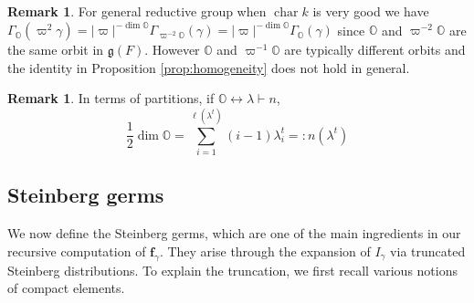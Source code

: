 \documentclass{amsart}
\numberwithin{equation}{section}
\theoremstyle{definition}
\newtheorem{remark}[lemma]{Remark}%
\newcommand{\fgamma}{\mathbf{f}_{\gamma}}
\newcommand{\fg}{\mathfrak{g}}
\DeclareMathOperator{\cchar}{\text{char}}
\begin{document}
\begin{remark} For general reductive group when $\cchar k$ is very good we have $\Gamma_{\mathbb{O}}(\varpi^2\gamma)=|\varpi|^{-\dim \mathbb{O}}\Gamma_{\varpi^{-2}\mathbb{O}}(\gamma)=|\varpi|^{-\dim\mathbb{O}}\Gamma_\mathbb{O}(\gamma)$ since $\mathbb{O}$ and $\varpi^{-2}\mathbb{O}$ are the same orbit in $\fg(F)$. However $\mathbb{O}$ and $\varpi^{-1}\mathbb{O}$ are typically different orbits and the identity in Proposition \ref{prop:homogeneity} does not hold in general.
\end{remark}
\begin{remark}
In terms of partitions, if $\mathbb{O}\leftrightarrow \lambda\vdash n$, 
$$\frac{1}{2}\dim\mathbb{O}=\sum_{i=1}^{\ell(\lambda^t)}(i-1)\lambda_i^t=:n(\lambda^t)$$
\end{remark}

\subsection{Steinberg germs}\label{subsec:steinbergsubsec}

We now define the Steinberg germs, which are one of the main ingredients in our recursive computation of $\fgamma$.
They arise through the expansion of $I_\gamma$ via truncated Steinberg distributions. To explain the truncation, we first recall various notions of compact elements.
\end{document}
